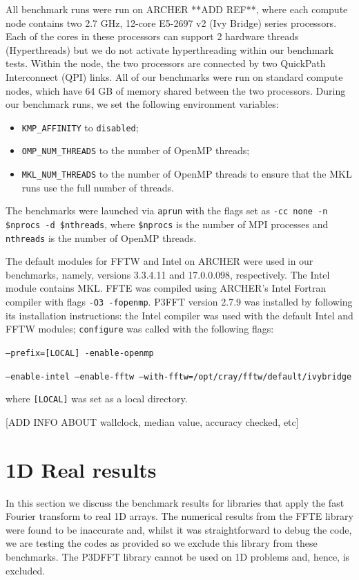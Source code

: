 \documentclass[a4]{article}
\begin{document}
All benchmark runs were run on ARCHER **ADD REF**, where each compute node 
contains two 
2.7 GHz, 12-core E5-2697 v2 (Ivy Bridge) series processors. Each of the cores 
in these processors can support 2 hardware threads (Hyperthreads) but we do 
not activate hyperthreading within our benchmark tests. Within the node, the 
two processors are connected by two QuickPath Interconnect (QPI) links. All of 
our benchmarks were run on standard compute nodes, which have 64 GB of memory 
shared between the two processors. During our benchmark runs, we set the following environment variables:
\begin{itemize}
\item \texttt{KMP\_AFFINITY} to \texttt{disabled};
\item \texttt{OMP\_NUM\_THREADS} to the number of OpenMP threads;
\item \texttt{MKL\_NUM\_THREADS} to the number of OpenMP threads to ensure that the MKL runs use the full number of threads.
\end{itemize}
The benchmarks were launched via \texttt{aprun} with the flags set as 
\texttt{-cc none -n \$nprocs -d \$nthreads}, where \texttt{\$nprocs} is the 
number of MPI processes and \texttt{nthreads} is the number of OpenMP threads.

The default modules for  FFTW and Intel on ARCHER were used in our benchmarks, 
namely, versions 3.3.4.11 and 17.0.0.098, respectively. The Intel module 
contains MKL. FFTE was compiled using ARCHER's Intel Fortran compiler with flags \texttt{-O3 -fopenmp}. P3FFT version 2.7.9 was installed by following its installation instructions: the Intel compiler was used with the default Intel and FFTW modules; \texttt{configure} was called with the following flags:

\noindent \texttt{--prefix=[LOCAL] -enable-openmp}

\noindent \texttt{--enable-intel --enable-fftw --with-fftw=/opt/cray/fftw/default/ivybridge}

\noindent where \texttt{[LOCAL]} was set as a local directory.

[ADD INFO ABOUT wallclock, median value, accuracy checked, etc]


\section{1D Real results}

In this section we discuss the benchmark results for libraries that apply the 
fast Fourier transform to real 1D arrays. The numerical results from the FFTE 
library were found to be inaccurate and, whilst it was straightforward to 
debug the code, we are testing the codes as provided so we exclude this 
library from these benchmarks. The P3DFFT library cannot be used on 1D 
problems and, hence, is excluded.
\end{document}
